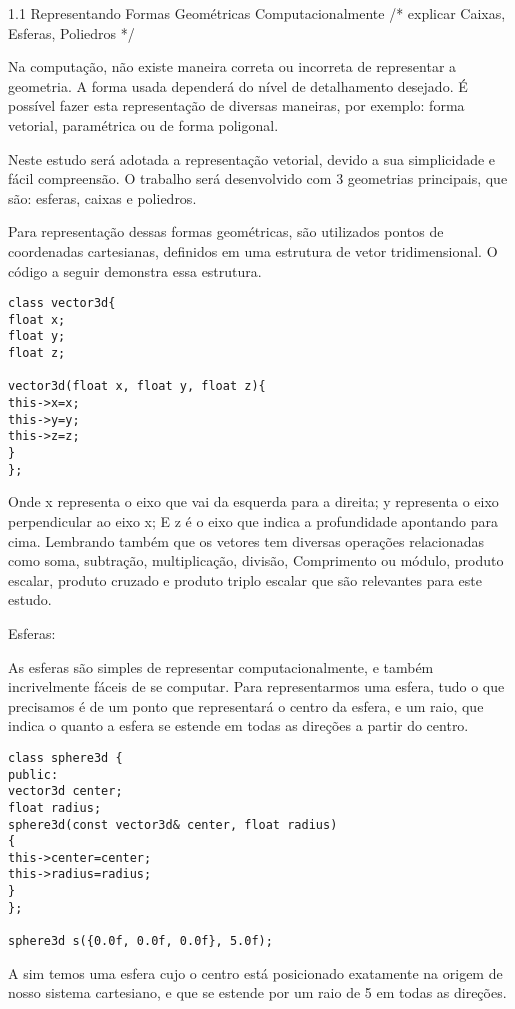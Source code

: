 1.1 Representando Formas Geométricas Computacionalmente
/* explicar Caixas, Esferas, Poliedros */

Na computação, não existe maneira correta ou incorreta de representar a
geometria. A forma usada dependerá  do nível de detalhamento desejado. É possível fazer esta representação de diversas maneiras, por exemplo: forma vetorial, paramétrica ou de forma poligonal.

Neste estudo será adotada a representação vetorial, devido a sua simplicidade e fácil compreensão. O trabalho será desenvolvido com 3 geometrias principais, que são: esferas, caixas e poliedros.

Para representação dessas formas geométricas, são utilizados pontos de coordenadas cartesianas, definidos em uma estrutura de vetor tridimensional. O código a seguir demonstra essa estrutura.

\begin{lstlisting}[caption={Exemplo de vetor},label={lst:vec1}]
class vector3d{
float x;
float y;
float z;

vector3d(float x, float y, float z){
this->x=x;
this->y=y;
this->z=z;
}
};
\end{lstlisting}

Onde x representa o eixo que vai da esquerda para a direita;
y representa o eixo  perpendicular ao eixo x;
E z é o eixo que indica a profundidade apontando para cima.
Lembrando também que os vetores tem diversas operações relacionadas como soma,
subtração, multiplicação, divisão, Comprimento ou módulo, produto escalar,
produto cruzado e produto triplo escalar que são relevantes para este estudo.

Esferas:

As esferas são simples de representar computacionalmente, e também
incrivelmente fáceis de se computar. Para representarmos uma esfera, tudo o que
precisamos é de um ponto que representará o centro da esfera, e um raio, que
indica o quanto a esfera se estende em todas as direções a partir do centro.

\begin{lstlisting}[caption={Exemplo de esfera},label={lst:sphere1}]
class sphere3d {
public:
vector3d center;
float radius;
sphere3d(const vector3d& center, float radius)
{
this->center=center;
this->radius=radius;
}
};

sphere3d s({0.0f, 0.0f, 0.0f}, 5.0f);
\end{lstlisting}

A sim temos uma esfera cujo o centro está posicionado exatamente na origem de
nosso sistema cartesiano, e que se estende por um raio de 5 em todas as
direções.

